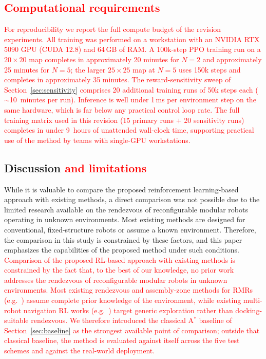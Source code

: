 \documentclass[journal]{IEEEtran}
\begin{document}
\textcolor{red}{\subsection{Computational requirements}\label{sec:compute}}
%
\textcolor{red}{For reproducibility we report the full compute budget of the revision experiments. All training was performed on a workstation with an NVIDIA RTX 5090 GPU (CUDA 12.8) and 64\,GB of RAM. A 100k-step PPO training run on a $20{\times}20$ map completes in approximately 20 minutes for $N = 2$ and approximately 25 minutes for $N = 5$; the larger $25{\times}25$ map at $N = 5$ uses 150k steps and completes in approximately 35 minutes. The reward-sensitivity sweep of Section~\ref{sec:sensitivity} comprises 20 additional training runs of 50k steps each ($\sim$10~minutes per run). Inference is well under 1\,ms per environment step on the same hardware, which is far below any practical control loop rate. The full training matrix used in this revision (15 primary runs $+$ 20 sensitivity runs) completes in under 9~hours of unattended wall-clock time, supporting practical use of the method by teams with single-GPU workstations.}

\subsection{Discussion \textcolor{red}{and limitations}}
\textcolor{green!60!black}{While it is valuable to compare the proposed reinforcement learning-based approach with existing methods, a direct comparison was not possible due to the limited research available on the rendezvous of reconfigurable modular robots operating in unknown environments. Most existing methods are designed for conventional, fixed-structure robots or assume a known environment. Therefore, the comparison in this study is constrained by these factors, and this paper emphasizes the capabilities of the proposed method under such conditions.}
\textcolor{red}{Comparison of the proposed RL-based approach with existing methods is constrained by the fact that, to the best of our knowledge, no prior work addresses the rendezvous of reconfigurable modular robots in unknown environments. Most existing rendezvous and assembly-zone methods for RMRs (e.g.~\cite{pasumarthi2025determining}) assume complete prior knowledge of the environment, while existing multi-robot navigation RL works (e.g.~\cite{10611573, multi5}) target generic exploration rather than docking-suitable rendezvous. We therefore introduced the classical A$^{*}$ baseline of Section~\ref{sec:baseline} as the strongest available point of comparison; outside that classical baseline, the method is evaluated against itself across the five test schemes and against the real-world deployment.}
\end{document}
